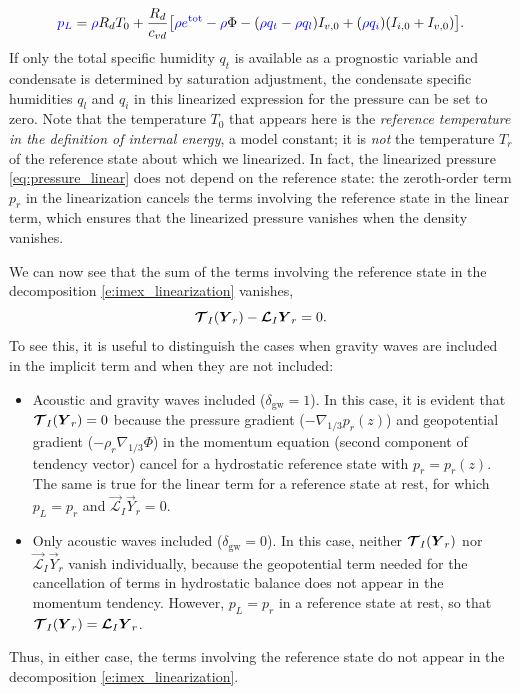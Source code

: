 \documentclass{report}
\begin{document}
\begin{equation}\label{eq:pressure_linear}
\textcolor{blue}{p_L} = \textcolor{blue}{\rho} R_d T_0 + \frac{R_d}{c_{vd}} \bigl[ \textcolor{blue}{\rho e^{\mathrm{tot}}} - \textcolor{blue}{\rho} \Phi - (\textcolor{blue}{\rho q_t} - \textcolor{blue}{\rho q_l})I_{v,0} + (\textcolor{blue}{\rho q_i}) (I_{i,0} + I_{v,0}) \bigr].
\end{equation}
If only the total specific humidity $q_t$ is available as a prognostic variable and condensate is determined by saturation adjustment, the condensate specific humidities $q_l$ and $q_i$ in this linearized expression for the pressure can be set to zero. Note that the temperature $T_0$ that appears here is the \emph{reference temperature in the definition of internal energy}, a model constant; it is \emph{not} the temperature $T_r$ of the reference state about which we linearized. In fact, the linearized pressure \eqref{eq:pressure_linear} does not depend on the reference state: the zeroth-order term $p_r$ in the linearization cancels the terms involving the reference state in the linear term, which ensures that the linearized pressure vanishes when the density vanishes. 

We can now see that the sum of the terms involving the reference state in the decomposition \eqref{e:imex_linearization} vanishes,
\[
\boldsymbol{{\mathcal{T}}}_I(\boldsymbol{{Y}}_r) - \boldsymbol{{\mathcal{L}}}_I \boldsymbol{{Y}}_r = 0.
\]
To see this, it is useful to distinguish the cases when gravity waves are included in the implicit term and when they are not included: 
\begin{itemize}
    \item Acoustic and gravity waves included ($\delta_{\mathrm{gw}}=1$). In this case, it is evident that $\boldsymbol{{\mathcal{T}}}_I(\boldsymbol{{Y}}_r)=0$ because the pressure gradient ($-\nabla_{1/3} p_r(z)$) and geopotential gradient ($-\rho_r\nabla_{1/3}\Phi$) in the momentum equation (second component of tendency vector) cancel for a hydrostatic reference state with $p_r = p_r(z)$. The same is true for the linear term for a reference state at rest, for which $p_L = p_r$ and $\vec{\mathcal{L}}_I \vec{Y}_r = 0$. 
    \item Only acoustic waves included ($\delta_{\mathrm{gw}}=0$). In this case, neither $\boldsymbol{{\mathcal{T}}}_I(\boldsymbol{{Y}}_r)$ nor $\vec{\mathcal{L}}_I\vec{Y}_r$ vanish individually, because the geopotential term needed for the cancellation of terms in hydrostatic balance does not appear in the momentum tendency. However, $p_L = p_r$ in a reference state at rest, so that $\boldsymbol{{\mathcal{T}}}_I(\boldsymbol{{Y}}_r) = \boldsymbol{{\mathcal{L}}}_I\boldsymbol{{Y}}_r$.
\end{itemize}
Thus, in either case, the terms involving the reference state do not appear  in the decomposition \eqref{e:imex_linearization}. 
\end{document}

